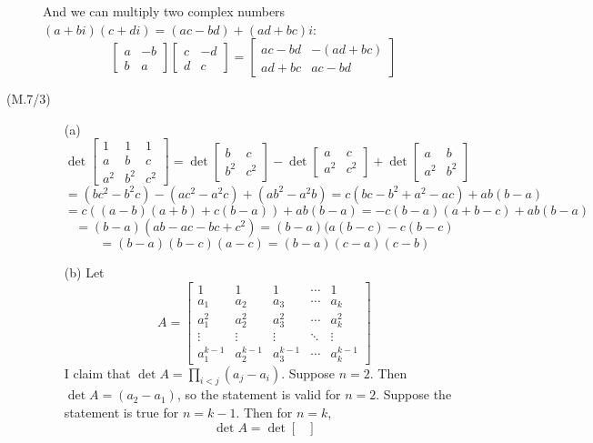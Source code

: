 \documentclass[openany]{book}
\begin{document}
\begin{description}
And we can multiply two complex numbers $(a + bi)(c + di) = (ac - bd) + (ad + bc)i$:
$$\begin{bmatrix}
a & -b \\
b & a
\end{bmatrix}\begin{bmatrix}
c & -d \\
d & c
\end{bmatrix} = \begin{bmatrix}
ac - bd & -(ad + bc) \\
ad + bc & ac - bd
\end{bmatrix}$$
\item[(M.7/3)]
\begin{itemize}
\item[(a)]
$$\det\begin{bmatrix}
1 & 1 & 1 \\
a & b & c \\
a^2 & b^2 & c^2
\end{bmatrix} = \det\begin{bmatrix}
b & c \\
b^2 & c^2
\end{bmatrix} - \det\begin{bmatrix}
a & c \\
a^2 & c^2
\end{bmatrix} + \det\begin{bmatrix}
a & b \\
a^2 & b^2
\end{bmatrix}$$
$$= (bc^2 - b^2c) - (ac^2 - a^2c) + (ab^2 - a^2b) = c(bc  - b^2 + a^2 - ac) + ab(b - a)$$
$$= c((a - b)(a + b) + c(b - a)) + ab(b - a) = -c(b - a)(a + b - c) + ab(b - a)$$
$$= (b - a)(ab - ac - bc + c^2) = (b - a)(a(b - c) - c(b - c)$$
$$= (b - a)(b - c)(a - c) = (b - a)(c - a)(c - b)$$
\item[(b)]
Let 
$$A = \begin{bmatrix}
1 & 1 & 1 & \cdots & 1 \\
a_1 & a_2 & a_3 & \cdots & a_k \\
a_1^2 & a_2^2 & a_3^2 & \cdots & a_k^2 \\
\vdots & \vdots & \vdots & \ddots & \vdots \\
a_1^{k-1} & a_2^{k-1} & a_3^{k-1} & \cdots & a_k^{k-1}
\end{bmatrix}$$
I claim that $\det A = \prod_{i < j}(a_j - a_i)$. Suppose $n = 2$. Then $\det A = (a_2 - a_1)$, so the statement is valid for $n = 2$. Suppose the statement is true for $n = k - 1$. Then for $n = k$,
$$\det A = \det\begin{bmatrix}

\end{bmatrix}$$
\end{itemize}
\end{description}
\end{document}
